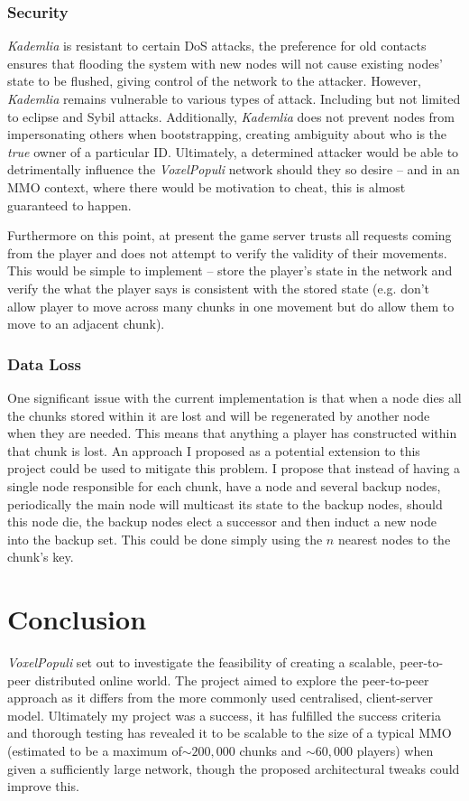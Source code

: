 \documentclass[12pt,notitlepage,a4paper]{report}
\newcommand{\kademlia}{\emph{Kademlia}}
\newcommand{\voxpop}{\emph{VoxelPopuli}}
\begin{document}
	\subsection{Security}
	\label{sec:security}
	\kademlia{} is resistant to certain DoS attacks, the preference for old contacts ensures that flooding the system with new nodes will not cause existing nodes' state to be flushed, giving control of the network to the attacker. However, \kademlia{} remains vulnerable to various types of attack. Including but not limited to eclipse and Sybil attacks. Additionally, \kademlia{} does not prevent nodes from impersonating others when bootstrapping, creating ambiguity about who is the \emph{true} owner of a particular ID. Ultimately, a determined attacker would be able to detrimentally influence the \voxpop{} network should they so desire -- and in an MMO context, where there would be motivation to cheat, this is almost guaranteed to happen.
	
	Furthermore on this point, at present the game server trusts all requests coming from the player and does not attempt to verify the validity of their movements. This would be simple to implement -- store the player's state in the network and verify the what the player says is consistent with the stored state (e.g. don't allow player to move across many chunks in one movement but do allow them to move to an adjacent chunk).
	
	\subsection{Data Loss}
	One significant issue with the current implementation is that when a node dies all the chunks stored within it are lost and will be regenerated by another node when they are needed. This means that anything a player has constructed within that chunk is lost. An approach I proposed as a potential extension to this project could be used to mitigate this problem. I propose that instead of having a single node responsible for each chunk, have a node and several backup nodes, periodically the main node will multicast its state to the backup nodes, should this node die, the backup nodes elect a successor and then induct a new node into the backup set. This could be done simply using the $n$ nearest nodes to the chunk's key.
	
	\clearpage
	\chapter{Conclusion}
	\voxpop{} set out to investigate the feasibility of creating a scalable, peer-to-peer distributed online world. The project aimed to explore the peer-to-peer approach as it differs from the more commonly used centralised, client-server model. Ultimately my project was a success, it has fulfilled the success criteria and thorough testing has revealed it to be scalable to the size of a typical MMO (estimated to be a maximum of$\sim200,000$ chunks and $\sim60,000$ players) when given a sufficiently large network, though the proposed architectural tweaks could improve this.
	
\end{document}
